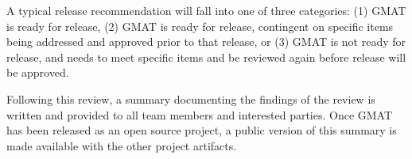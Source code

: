 A typical release recommendation will fall into one of three categories: (1) GMAT is ready for release, (2) GMAT is ready for release, contingent on specific items being addressed and approved prior to that release, or (3) GMAT is not ready for release, and needs to meet specific items and be reviewed again before release will be approved.

Following this review, a summary documenting the findings of the review is written and provided to all team members and interested parties.  Once GMAT has been released as an open source project, a public version of this summary is made available with the other project artifacts.
